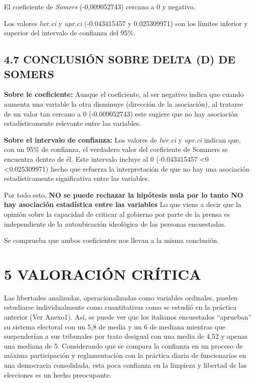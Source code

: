 \documentclass[
  12 pt,
  a4paper,
]{article}
\begin{document}
El coeficiente de \emph{Somers} (-0,009052743) cercano a 0 y negativo.

Los valores \emph{lwr.ci} y \emph{upr.ci} (-0.043415457 y 0.025309971)
son los límites inferior y superior del intervalo de confianza del 95\%.

\subsection{4.7 CONCLUSIÓN SOBRE DELTA (D) DE
SOMERS}\label{conclusiuxf3n-sobre-delta-d-de-somers}

\textbf{Sobre le coeficiente:} Aunque el coeficiente, al ser negativo
indica que cuando aumenta una variable la otra disminuye (dirección de
la asociación), al tratarse de un valor tan cercano a 0 (-0.009052743)
este sugiere que no hay asociación estadísticamente relevante entre las
variables.

\textbf{Sobre el intervalo de confianza:} Los valores de \emph{lwr.ci} y
\emph{upr.ci} indican que, con un 95\% de confianza, el verdadero valor
del coeficiente de Sommers se encuentra dentro de él. Este intervalo
incluye al 0 (-0.043415457 \textless0 \textless0.025309971) hecho que
refuerza la interpretación de que no hay una asociación estadísticamente
significativa entre las variables.

Por todo esto, \textbf{NO se puede rechazar la hipótesis nula por lo
tanto NO hay asociación estadística entre las variables} Lo que viene a
decir que la opinión sobre la capacidad de criticar al gobierno por
parte de la prensa es independiente de la autoubicación ideológica de
las personas encuestadas.

Se comprueba que ambos coeficientes nos llevan a la misma conclusión.

\newpage

\section{5 VALORACIÓN CRÍTICA}\label{valoraciuxf3n-cruxedtica}

Las libertades analizadas, operacionalizadas como variables ordinales,
pueden estudiarse individualmente como cuantitativas como se estudió en
la práctica anterior (Ver Anexo1). Así, se puede ver que los italianos
encuestados ``aprueban'' su sistema electoral con un 5,8 de media y un 6
de mediana mientras que suspenderían a sus tribunales por trato desigual
con una media de 4,52 y apenas una mediana de 5. Considerando que se
compara la confianza en un proceso de máxima participación y
reglamentación con la práctica diaria de funcionarios en una democracia
consolidada, esta poca confianza en la limpieza y libertad de las
elecciones es un hecho preocupante.
\end{document}
